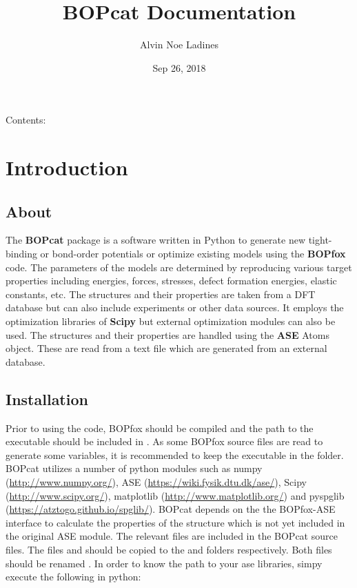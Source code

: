 \documentclass[letterpaper,10pt,english]{sphinxmanual}
\title{BOPcat Documentation}
\date{Sep 26, 2018}
\author{Alvin Noe Ladines}
\begin{document}
\maketitle
\tableofcontents
{}\label{bopcat::doc}


Contents:


\chapter{Introduction}
\label{intro:introduction}\label{intro:welcome-to-bopcat-s-documentation}\label{intro::doc}

\section{About}
\label{intro:about}
The \textbf{BOPcat} package is a software written in Python to generate
new tight-binding or bond-order potentials or optimize existing models using
the \textbf{BOPfox} code. The parameters of the models are determined by reproducing
various target properties including energies, forces, stresses, defect formation energies,
elastic constants, etc. The structures and their properties are taken from a DFT database
but can also include experiments or other data sources.
It employs the optimization libraries of \textbf{Scipy} but external optimization
modules can also be used.
The structures and their properties are handled using the \textbf{ASE} Atoms object.
These are read from a text file which are generated from an external
database.


\section{Installation}
\label{intro:installation}
Prior to using the code, BOPfox should be compiled and the
path to the executable should be included in . As some BOPfox source files
are read to generate some variables, it is recommended to keep the executable in the
 folder. BOPcat utilizes a number of python modules
such as numpy (\url{http://www.numpy.org/}), ASE (\url{https://wiki.fysik.dtu.dk/ase/}), Scipy (\url{http://www.scipy.org/}),
matplotlib (\url{http://www.matplotlib.org/}) and pyspglib (\url{https://atztogo.github.io/spglib/}). BOPcat depends
on the the BOPfox-ASE interface to calculate the properties of the structure which is not
yet included in the original ASE module. The relevant files are included in the
BOPcat source files. The files  and  should be
copied to the  and  folders respectively. Both files should be renamed
. In order to know the path to your ase libraries, simpy execute the following in
python:
\end{document}
